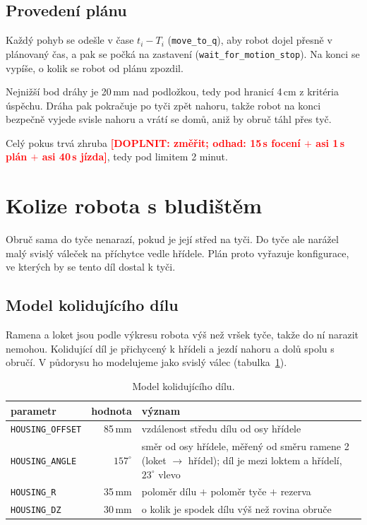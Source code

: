 \documentclass[11pt,a4paper]{article}
\newcommand{\doplnit}[1]{\textcolor{red}{\textbf{[DOPLNIT: #1]}}}
\begin{document}
\subsection{Provedení plánu}

Každý pohyb se odešle v čase $t_i - T_i$ (\texttt{move\_to\_q}), aby robot dojel přesně
v plánovaný čas, a pak se počká na zastavení (\texttt{wait\_for\_motion\_stop}). Na konci se
vypíše, o kolik se robot od plánu zpozdil.

Nejnižší bod dráhy je 20\,mm nad podložkou, tedy pod hranicí 4\,cm z kritéria úspěchu. Dráha
pak pokračuje po tyči zpět nahoru, takže robot na konci bezpečně vyjede svisle nahoru
a vrátí se domů, aniž by obruč táhl přes tyč.

Celý pokus trvá zhruba \doplnit{změřit; odhad: 15\,s focení $+$ asi 1\,s plán $+$ asi
40\,s jízda}, tedy pod limitem 2 minut.

\section{Kolize robota s bludištěm}
\label{sec:kolize}

Obruč sama do tyče nenarazí, pokud je její střed na tyči. Do tyče ale narážel malý svislý
váleček na příchytce vedle hřídele. Plán proto vyřazuje konfigurace, ve kterých by se tento
díl dostal k tyči.

\subsection{Model kolidujícího dílu}

Ramena a loket jsou podle výkresu robota výš než vršek tyče, takže do ní narazit nemohou.
Kolidující díl je přichycený k hřídeli a jezdí nahoru a dolů spolu s obručí. V půdorysu ho
modelujeme jako svislý válec (tabulka~\ref{tab:dil}).

\begin{table}[ht]
\centering
\begin{tabularx}{\linewidth}{@{}l r X@{}}
\toprule
parametr & hodnota & význam \\
\midrule
\texttt{HOUSING\_OFFSET} & 85\,mm & vzdálenost středu dílu od osy hřídele \\
\texttt{HOUSING\_ANGLE} & $157^\circ$ & směr od osy hřídele, měřený od směru ramene 2 (loket $\to$ hřídel);
  díl je mezi loktem a hřídelí, $23^\circ$ vlevo \\
\texttt{HOUSING\_R} & 35\,mm & poloměr dílu $+$ poloměr tyče $+$ rezerva \\
\texttt{HOUSING\_DZ} & 30\,mm & o kolik je spodek dílu výš než rovina obruče \\
\bottomrule
\end{tabularx}
\caption{Model kolidujícího dílu.}
\label{tab:dil}
\end{table}
\end{document}
